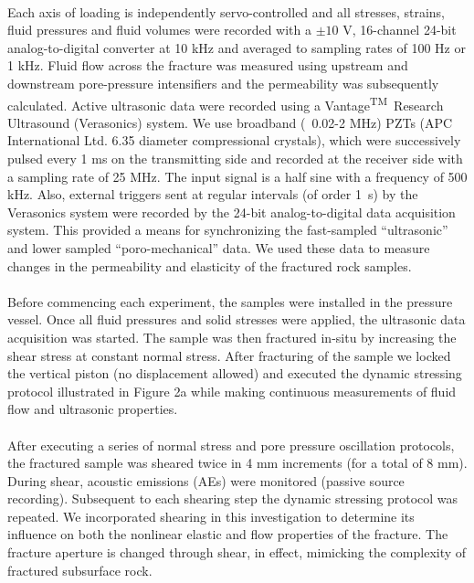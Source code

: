 \documentclass[letterpaper,10pt]{article}
\begin{document}
	
	\paragraph{} Each axis of loading is independently servo-controlled and all stresses, strains, fluid pressures and fluid volumes were recorded with a $\pm10$ V, 16-channel 24-bit analog-to-digital converter at 10 kHz and averaged to sampling rates of 100 Hz or 1 kHz. Fluid flow across the fracture was measured using upstream and downstream pore-pressure intensifiers and the permeability was subsequently calculated. Active ultrasonic data were recorded using a Vantage\textsuperscript{TM}\ Research Ultrasound (Verasonics) system. We use broadband (~0.02-2 MHz) PZTs (APC International Ltd. 6.35 diameter compressional crystals), which were successively pulsed every 1 ms on the transmitting side and recorded at the receiver side with a sampling rate of 25 MHz. The input signal is a half sine with a frequency of 500 kHz. Also, external triggers sent at regular intervals (of order 1~s) by the Verasonics system were recorded by the 24-bit analog-to-digital data acquisition system. This provided a means for synchronizing the fast-sampled “ultrasonic” and lower sampled “poro-mechanical” data. We used these data to measure changes in the permeability and elasticity of the fractured rock samples.
	
	\paragraph{} Before commencing each experiment, the samples were installed in the pressure vessel. Once all fluid pressures and solid stresses were applied, the ultrasonic data acquisition was started. The sample was then fractured in-situ by increasing the shear stress at constant normal stress. After fracturing of the sample we locked the vertical piston (no displacement allowed) and executed the dynamic stressing protocol illustrated in Figure 2a while making continuous measurements of fluid flow and ultrasonic properties.
	
	\paragraph{} After executing a series of normal stress and pore pressure oscillation protocols, the fractured sample was sheared twice in 4 mm increments (for a total of 8 mm). During shear, acoustic emissions (AEs) were monitored (passive source recording). Subsequent to each shearing step the dynamic stressing protocol was repeated. We incorporated shearing in this investigation to determine its influence on both the nonlinear elastic and flow properties of the fracture. The fracture aperture is changed through shear, in effect, mimicking the complexity of fractured subsurface rock.
	
\end{document}
